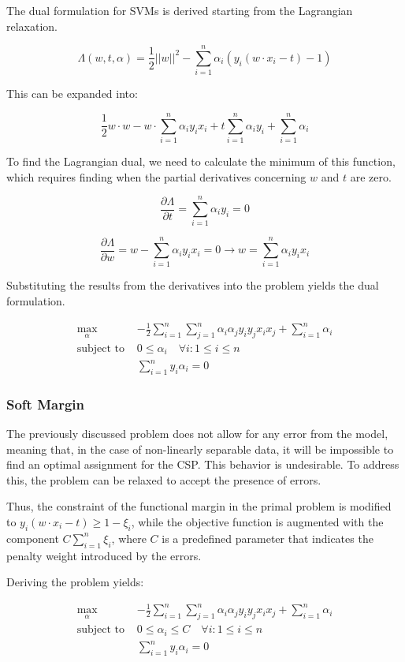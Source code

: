 The dual formulation for SVMs is derived starting from the Lagrangian relaxation.

$$\Lambda(w, t, \alpha) = \frac{1}{2}||w||^2 - \sum_{i=1}^n\alpha_i(y_i(w\cdot x_i - t) - 1)$$

This can be expanded into:

$$\frac{1}{2}w\cdot w - w\cdot\sum_{i=1}^n\alpha_iy_ix_i + t\sum_{i=1}^n\alpha_iy_i + \sum_{i=1}^n\alpha_i$$

To find the Lagrangian dual, we need to calculate the minimum of this function, which requires finding when the partial derivatives concerning $w$ and $t$ are zero.

$$\frac{\partial\Lambda}{\partial t} = \sum_{i=1}^n\alpha_iy_i = 0$$

$$\frac{\partial\Lambda}{\partial w} = w - \sum_{i=1}^n\alpha_iy_ix_i = 0 \to w = \sum_{i=1}^n\alpha_iy_ix_i$$

Substituting the results from the derivatives into the problem yields the dual formulation.

\begin{align*}
    \max_\alpha\ & -\frac{1}{2}\sum_{i=1}^n\sum_{j=1}^n\alpha_i\alpha_jy_iy_jx_ix_j + \sum_{i=1}^n
  \alpha_i \\
    \text{subject to } & 0 \leq \alpha_i \quad \forall i: 1\leq i\leq n \\
    & \sum_{i=1}^ny_i\alpha_i=0
\end{align*}

\subsubsection{Soft Margin}\label{sec:soft}

The previously discussed problem does not allow for any error from the model, meaning that, in the case of non-linearly separable data, it will be impossible to find an optimal assignment for the CSP. This behavior is undesirable. To address this, the problem can be relaxed to accept the presence of errors.

Thus, the constraint of the functional margin in the primal problem is modified to $y_i(w\cdot x_i-t)\geq1-\xi_i$, while the objective function is augmented with the component $C\sum_{i=1}^n\xi_i$, where $C$ is a predefined parameter that indicates the penalty weight introduced by the errors.

Deriving the problem yields:

\begin{align*}
    \max_\alpha\ & -\frac{1}{2}\sum_{i=1}^n\sum_{j=1}^n\alpha_i\alpha_jy_iy_jx_ix_j + \sum_{i=1}^n
  \alpha_i \\
    \text{subject to } & 0 \leq \alpha_i \leq C \quad \forall i: 1\leq i\leq n \\
    & \sum_{i=1}^ny_i\alpha_i=0
\end{align*}

